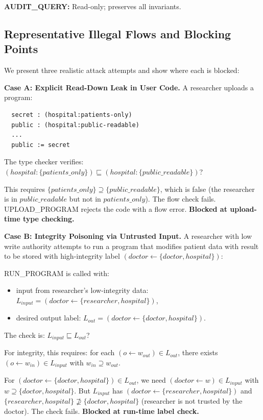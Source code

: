\textbf{AUDIT\_QUERY:} Read-only; preserves all invariants.


\subsection{Representative Illegal Flows and Blocking Points}

We present three realistic attack attempts and show where each is blocked:

\textbf{Case A: Explicit Read-Down Leak in User Code.} A researcher uploads a program:
\begin{verbatim}
  secret : (hospital:patients-only)
  public : (hospital:public-readable)
  ...
  public := secret
\end{verbatim}

The type checker verifies: $(hospital:\{patients\_only\}) \sqsubseteq (hospital:\{public\_readable\})$?

This requires $\{patients\_only\} \supseteq \{public\_readable\}$, which is false (the researcher is in $public\_readable$ but not in $patients\_only$). The flow check fails. UPLOAD\_PROGRAM rejects the code with a flow error. \textbf{Blocked at upload-time type checking.}

\textbf{Case B: Integrity Poisoning via Untrusted Input.} A researcher with low write authority attempts to run a program that modifies patient data with result to be stored with high-integrity label $(doctor \leftarrow \{doctor,hospital\})$:

RUN\_PROGRAM is called with:
\begin{itemize}
    \item input from researcher's low-integrity data: $L_{input} = (doctor \leftarrow \{researcher,hospital\})$,
    \item desired output label: $L_{out} = (doctor \leftarrow \{doctor,hospital\})$.
\end{itemize}

The check is: $L_{input} \sqsubseteq L_{out}$?

For integrity, this requires: for each $(o \leftarrow w_{out}) \in L_{out}$, there exists $(o \leftarrow w_{in}) \in L_{input}$ with $w_{in} \supseteq w_{out}$.

For $(doctor \leftarrow \{doctor,hospital\}) \in L_{out}$, we need $(doctor \leftarrow w) \in L_{input}$ with $w \supseteq \{doctor,hospital\}$. But $L_{input}$ has $(doctor \leftarrow \{researcher,hospital\})$ and $\{researcher,hospital\} \not\supseteq \{doctor,hospital\}$ (researcher is not trusted by the doctor). The check fails. \textbf{Blocked at run-time label check.}

